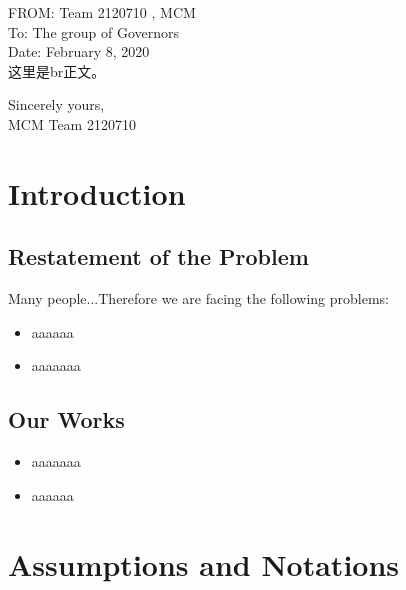 \documentclass[13pt]{ctexart} %
\begin{document}
\noindent FROM: Team {} 2120710 , MCM\\
\noindent To: The group of Governors\\
\noindent Date: February 8, 2020
\vspace{10pt}
\\
这里是br正文。

\thispagestyle{empty}
{\raggedleft
    Sincerely yours,\\
    MCM Team 2120710\par
}

\newpage
\thispagestyle{empty}
\tableofcontents
\newpage
\setcounter{page}{1}

\fancyhf{}
\fancyhead[C]{ }
\fancyfoot[C]{\bfseries\thepage}

\section{Introduction}
\subsection{Restatement of the Problem}
Many people...Therefore we are facing the following problems:
\begin{itemize}
    \item aaaaaa
    \item aaaaaaa
\end{itemize}

\subsection{Our Works}
\begin{itemize}
    \item aaaaaaa
    \item aaaaaa
\end{itemize}
\fancyfoot[C]{\bfseries\thepage}

\section{Assumptions and Notations}
\vspace{-10pt}
\end{document}
